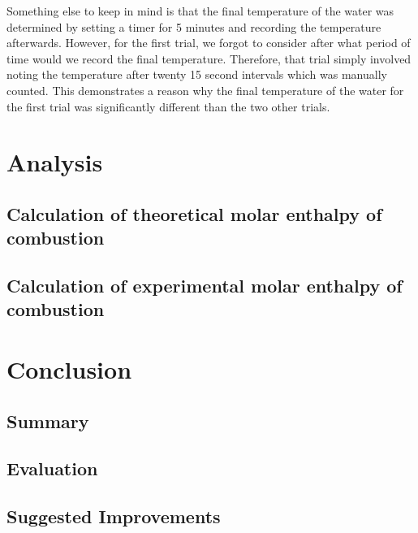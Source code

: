 \documentclass[
	letterpaper, %
	12pt, %
]{CSUniSchoolLabReport}
\begin{document}
Something else to keep in mind is that the final temperature of the water was determined by
setting a timer for 5 minutes and recording the temperature afterwards. However,
for the first trial, we forgot to consider after what period of time would we record
the final temperature. Therefore, that trial simply involved noting the temperature after twenty
15 second intervals which was manually counted. This demonstrates a reason why
the final temperature of the water for the first trial was significantly different than
the two other trials.

\section{Analysis}

\subsection{Calculation of theoretical molar enthalpy of combustion}



\subsection{Calculation of experimental molar enthalpy of combustion}

\section{Conclusion}

\subsection{Summary}

\subsection{Evaluation}

\subsection{Suggested Improvements}


\printbibliography %

\end{document}
